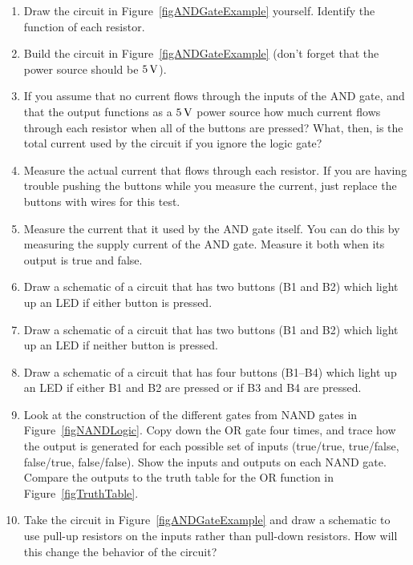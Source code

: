 \applysection

\begin{enumerate}
\item Draw the circuit in Figure~\ref{figANDGateExample} yourself.  Identify the function of each resistor.
\item Build the circuit in Figure~\ref{figANDGateExample} (don't forget that the power source should be $5\,\si{\volt}$).
\item If you assume that no current flows through the inputs of the AND gate, and that the output functions as a $5\,\si{\volt}$ power source how much current flows through each resistor when all of the buttons are pressed?  What, then, is the total current used by the circuit if you ignore the logic gate?
\item Measure the actual current that flows through each resistor.  If you are having trouble pushing the buttons while you measure the current, just replace the buttons with wires for this test.
\item Measure the current that it used by the AND gate itself.  You can do this by measuring the supply current of the AND gate.  Measure it both when its output is true and false.
\item Draw a schematic of a circuit that has two buttons (B1 and B2) which light up an LED if either button is pressed.
\item Draw a schematic of a circuit that has two buttons (B1 and B2) which light up an LED if neither button is pressed.
\item Draw a schematic of a circuit that has four buttons (B1--B4) which light up an LED if either B1 and B2 are pressed or if B3 and B4 are pressed.
\item Look at the construction of the different gates from NAND gates in Figure~\ref{figNANDLogic}.  Copy down the OR gate four times, and trace how the output is generated for each possible set of inputs (true/true, true/false, false/true, false/false).  Show the inputs and outputs on each NAND gate.  Compare the outputs to the truth table for the OR function in Figure~\ref{figTruthTable}.
\item Take the circuit in Figure~\ref{figANDGateExample} and draw a schematic to use pull-up resistors on the inputs rather than pull-down resistors.  How will this change the behavior of the circuit?
\end{enumerate}
